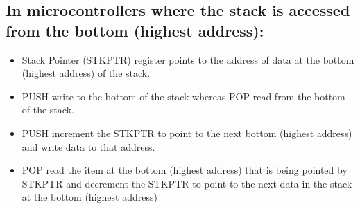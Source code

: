 \documentclass{article}
\begin{document}
\subsection*{In microcontrollers where the stack is accessed from the bottom (highest address):}
\begin{itemize}
\item Stack Pointer (STKPTR) register points to the address of data at the bottom (highest address) of the stack.
\item PUSH write to the bottom of the stack whereas POP read from the bottom of the stack.
\item PUSH increment the STKPTR to point to the next bottom (highest address) and write data to that address.
\item POP read the item at the bottom (highest address) that is being pointed by STKPTR and decrement the STKPTR to point to the next data in the stack at the bottom (highest address)
\end{itemize}
\end{document}
